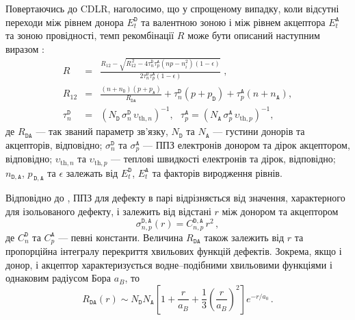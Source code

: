 Повертаючись до CDLR, наголосимо, що
у спрощеному випадку, коли відсутні переходи між рівнем донора $E_t^{\mathtt{D}}$ та валентною зоною
і між рівнем акцептора $E_t^{\mathtt{A}}$ та зоною провідності,
темп рекомбінації $R$ може бути описаний наступним виразом \cite{CDLR:JAP1995}:
\begin{eqnarray}
R&=&\frac{R_{12}-\sqrt{R_{12}^{\,2}-4\tau_{n}^{\mathtt{D}}\tau_{p}^{\mathtt{A}}(np-n_i^2)(1-\epsilon)}}{2\tau_{n}^{\mathtt{D}}\tau_{p}^{\mathtt{A}}(1-\epsilon)}\;,\label{eqR}\\
R_{12}&=&\frac{(n+n_{\mathtt{D}})(p+p_{\mathtt{A}})}{R_{\mathtt{DA}}}+
\tau_{n}^{\mathtt{D}}(p+p_{\mathtt{D}})+\tau_{p}^{\mathtt{A}}(n+n_{\mathtt{A}}),\label{eqR12}\\
\tau_{n}^{\mathtt{D}}&=&(N_{\mathtt{D}}\,\sigma_{n}^{\mathtt{D}}\,\upsilon_{\mathrm{th},n})^{-1},\,\,\,\,
\tau_{p}^{\mathtt{A}}=(N_{\mathtt{A}}\,\sigma_{p}^{\mathtt{A}}\,\upsilon_{\mathrm{th},p})^{-1},\label{eqTAU}
\end{eqnarray}
де
$R_{\mathtt{DA}}$ --- так званий параметр зв'язку,
$N_{\mathtt{D}}$ та $N_{\mathtt{A}}$ --- густини донорів та акцепторів, відповідно;
$\sigma_{n}^{\mathtt{D}}$ та $\sigma_{p}^{\mathtt{A}}$ --- ППЗ електронів донором та дірок акцептором, відповідно;
$\upsilon_{\mathrm{th},n}$ та $\upsilon_{\mathrm{th},p}$ --- теплові швидкості електронів та дірок, відповідно;
$n_{\mathtt{D,A}}$, $p_{\,\mathtt{D,A}}$ та $\epsilon$ залежать від $E_t^{\mathtt{D}}$, $E_t^{\mathtt{A}}$ та факторів виродження рівнів.

Відповідно до \cite{CDLR:JAP},
ППЗ для дефекту в парі відрізняється від значення, характерного для ізольованого дефекту, і залежить від відстані $r$ між донором та акцептором
\begin{equation}
\label{eqSigma}
\sigma_{n,p}^{\mathtt{D,A}}(r)=C_{n,p}^{\mathtt{D,A}}\,r^2\,,
\end{equation}
де $C_{n}^{\mathtt{D}}$ та $C_{p}^{\mathtt{A}}$ --- певні константи.
Величина $R_{\mathtt{DA}}$ також залежить від $r$ та пропорційна інтегралу перекриття хвильових функцій дефектів.
Зокрема, якщо і донор, і акцептор характеризується водне--подібними хвильовими функціями і однаковим радіусом Бора $a_B$, то \cite{CDLR:JAP}
\begin{equation}
\label{eqRda}
R_{\mathtt{DA}} (r) \sim N_{\mathtt{D}}N_{\mathtt{A}}\left[1+\frac{r}{a_B}+\frac{1}{3}\left(\frac{r}{a_B}\right)^2\right]
   e^{-r/a_0}\,.
\end{equation}

